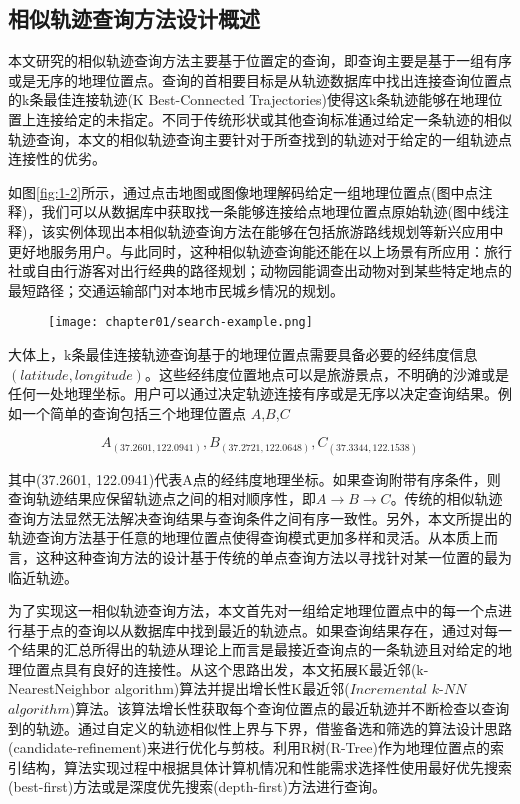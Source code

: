 \subsection{相似轨迹查询方法设计概述}
\label{subsec:requirements}
本文研究的相似轨迹查询方法主要基于位置定的查询，即查询主要是基于一组有序或是无序的地理位置点。查询的首相要目标是从轨迹数据库中找出连接查询位置点的k条最佳连接轨迹(K Best-Connected Trajectories)使得这k条轨迹能够在地理位置上连接给定的未指定。不同于传统形状或其他查询标准通过给定一条轨迹的相似轨迹查询，本文的相似轨迹查询主要针对于所查找到的轨迹对于给定的一组轨迹点连接性的优劣。

如图\ref{fig:1-2}\cite{chen2010searching}所示，通过点击地图或图像地理解码给定一组地理位置点(图中点注释)，我们可以从数据库中获取找一条能够连接给点地理位置点原始轨迹(图中线注释)，该实例体现出本相似轨迹查询方法在能够在包括旅游路线规划等新兴应用中更好地服务用户。与此同时，这种相似轨迹查询能还能在以上场景有所应用：旅行社或自由行游客对出行经典的路径规划；动物园能调查出动物对到某些特定地点的最短路径；交通运输部门对本地市民城乡情况的规划。

\begin{figure}[!htp]
  \centering
  \texttt{[image: chapter01/search-example.png]}
\end{figure}

大体上，k条最佳连接轨迹查询基于的地理位置点需要具备必要的经纬度信息$(latitude,longitude)$。这些经纬度位置地点可以是旅游景点，不明确的沙滩或是任何一处地理坐标。用户可以通过决定轨迹连接有序或是无序以决定查询结果。例如一个简单的查询包括三个地理位置点 $A$,$B$,$C$

\begin{displaymath}
	{A_{(37.2601, 122.0941)}, B_{(37.2721, 122.0648)}, C_{(37.3344,122.1538)}}
\end{displaymath}

其中(37.2601, 122.0941)代表A点的经纬度地理坐标。如果查询附带有序条件，则查询轨迹结果应保留轨迹点之间的相对顺序性，即$A \rightarrow B \rightarrow C$。传统的相似轨迹查询方法显然无法解决查询结果与查询条件之间有序一致性。另外，本文所提出的轨迹查询方法基于任意的地理位置点使得查询模式更加多样和灵活。从本质上而言，这种这种查询方法的设计基于传统的单点查询方法以寻找针对某一位置的最为临近轨迹。

为了实现这一相似轨迹查询方法，本文首先对一组给定地理位置点中的每一个点进行基于点的查询以从数据库中找到最近的轨迹点。如果查询结果存在，通过对每一个结果的汇总所得出的轨迹从理论上而言是最接近查询点的一条轨迹且对给定的地理位置点具有良好的连接性。从这个思路出发，本文拓展K最近邻(k-NearestNeighbor algorithm)算法并提出增长性K最近邻($Incremental$ $k$-$NN$ $algorithm$)算法。该算法增长性获取每个查询位置点的最近轨迹并不断检查以查询到的轨迹。通过自定义的轨迹相似性上界与下界，借鉴备选和筛选的算法设计思路(candidate-refinement)来进行优化与剪枝。利用R树(R-Tree)作为地理位置点的索引结构，算法实现过程中根据具体计算机情况和性能需求选择性使用最好优先搜索(best-first)方法或是深度优先搜索(depth-first)方法进行查询。

